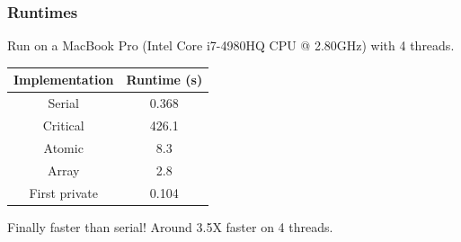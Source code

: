 \documentclass{beamer}
\begin{document}
\begin{frame}
\frametitle{Runtimes}
Run on a MacBook Pro (Intel Core i7-4980HQ CPU @ 2.80GHz) with 4 threads.

\vfill

\begin{table}
\begin{tabular}{cc}
\toprule
Implementation & Runtime (s) \\
\midrule
Serial        & 0.368 \\
Critical      & 426.1 \\
Atomic        & 8.3 \\
Array         & 2.8 \\
First private & 0.104 \\
\bottomrule
\end{tabular}
\end{table}


\begin{center}
\large Finally faster than serial! Around 3.5X faster on 4 threads.
\end{center}

\end{frame}

\end{document}
